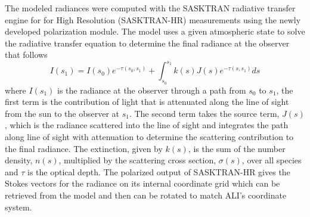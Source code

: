 \documentclass[12pt]{article}
\begin{document}
The modeled radiances were computed with the SASKTRAN radiative transfer engine \citep{Bourassa2008a} for for High Resolution (SASKTRAN-HR) \citep{Zawada2015} measurements using the newly developed polarization module\citep{Dueck2015}. The model uses a given atmospheric state to solve the radiative transfer equation to determine the final radiance at the observer that follows
\begin{equation}
    I(s_{1}) = I(s_{0})e^{-\tau(s_{0}, s_{1})}+\int^{s_{1}}_{s_{0}}k(s)J(s)e^{-\tau(s, s_{1})}ds
\end{equation}
where $I(s_{1})$ is the radiance at the observer through a path from $s_{0}$ to $s_{1}$, the first term is the contribution of light that is attenuated along the line of sight from the sun to the observer at $s_{1}$. The second term takes the source term, $J(s)$, which is the radiance scattered into the line of sight and integrates the path along line of sight with attenuation to determine the scattering contribution to the final radiance. The extinction, given by $k(s)$, is the sum of the number density, $n(s)$, multiplied by the scattering cross section, $\sigma(s)$, over all species and $\tau$ is the optical depth. The polarized output of SASKTRAN-HR gives the Stokes vectors for the radiance on its internal coordinate grid which can be retrieved from the model and then can be rotated to match ALI's coordinate system.
\end{document}
